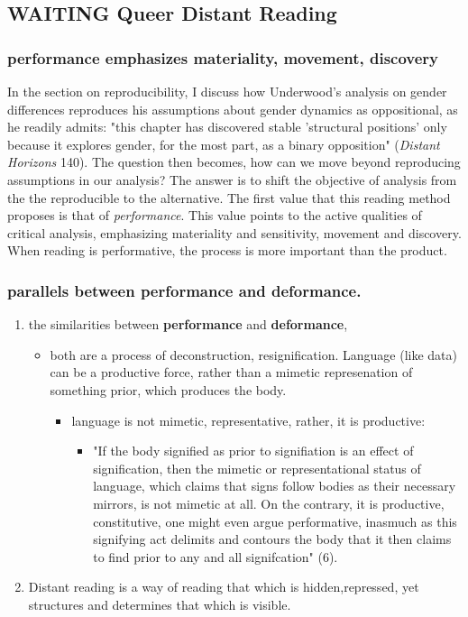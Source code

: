 \documentclass[11pt]{article}
\begin{document}
\subsection{{\bfseries\sffamily WAITING} Queer Distant Reading}
\label{sec:org269abb2}
\subsubsection{performance emphasizes materiality, movement, discovery}
\label{sec:org2f273a2}
In the section on reproducibility, I discuss how Underwood's analysis
on gender differences reproduces his assumptions about gender dynamics
as oppositional, as he readily admits: "this chapter has discovered
stable 'structural positions' only because it explores gender, for the
most part, as a binary opposition" (\emph{Distant Horizons} 140). The
question then becomes, how can we move beyond reproducing assumptions
in our analysis? The answer is to shift the objective of analysis from
the the reproducible to the alternative. The first value that this
reading method proposes is that of \emph{performance}. This value points to
the active qualities of critical analysis, emphasizing materiality and
sensitivity, movement and discovery. When reading is performative, the
process is more important than the product. 
\subsubsection{parallels between performance and deformance.}
\label{sec:org8fdf2aa}
\begin{enumerate}
\item the similarities between \textbf{performance} and \textbf{deformance},
\label{sec:orge3abad9}

\begin{itemize}
\item both are a process of deconstruction, resignification. Language
(like data) can be a productive force, rather than a mimetic
represenation of something prior, which produces the body.

\begin{itemize}
\item language is not mimetic, representative, rather, it is productive:
\begin{itemize}
\item "If the body signified as prior to signifiation is an effect of
signification, then the mimetic or representational status of
language, which claims that signs follow bodies as their
necessary mirrors, is not mimetic at all. On the contrary, it is
productive, constitutive, one might even argue performative,
inasmuch as this signifying act delimits and contours the body
that it then claims to find prior to any and all signifcation"
(6).
\end{itemize}
\end{itemize}
\end{itemize}

\item Distant reading is a way of reading that which is hidden,repressed, yet structures and determines that which is visible.
\label{sec:orgd73f39e}
\end{enumerate}
\end{document}
